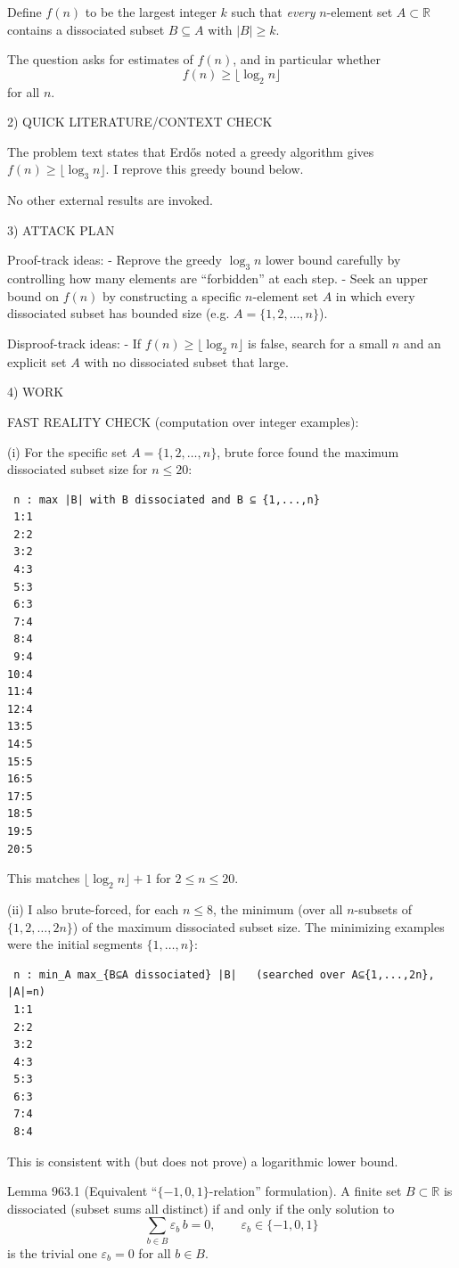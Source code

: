 Define $f(n)$ to be the largest integer $k$ such that \emph{every} $n$-element set $A\subset\mathbb R$ contains a dissociated subset $B\subseteq A$ with $|B|\ge k$.

The question asks for estimates of $f(n)$, and in particular whether
\[
 f(n)\ge \lfloor \log_2 n\rfloor
\]
for all $n$.

2) QUICK LITERATURE/CONTEXT CHECK

The problem text states that Erd\H{o}s noted a greedy algorithm gives $f(n)\ge \lfloor \log_3 n\rfloor$. I reprove this greedy bound below.

No other external results are invoked.

3) ATTACK PLAN

Proof-track ideas:
- Reprove the greedy $\log_3 n$ lower bound carefully by controlling how many elements are “forbidden” at each step.
- Seek an upper bound on $f(n)$ by constructing a specific $n$-element set $A$ in which every dissociated subset has bounded size (e.g. $A=\{1,2,\dots,n\}$).

Disproof-track ideas:
- If $f(n)\ge \lfloor\log_2 n\rfloor$ is false, search for a small $n$ and an explicit set $A$ with no dissociated subset that large.

4) WORK

FAST REALITY CHECK (computation over integer examples):

(i) For the specific set $A=\{1,2,\dots,n\}$, brute force found the maximum dissociated subset size for $n\le 20$:
\begin{verbatim}
 n : max |B| with B dissociated and B ⊆ {1,...,n}
 1:1
 2:2
 3:2
 4:3
 5:3
 6:3
 7:4
 8:4
 9:4
10:4
11:4
12:4
13:5
14:5
15:5
16:5
17:5
18:5
19:5
20:5
\end{verbatim}
This matches $\lfloor \log_2 n\rfloor+1$ for $2\le n\le 20$.

(ii) I also brute-forced, for each $n\le 8$, the minimum (over all $n$-subsets of $\{1,2,\dots,2n\}$) of the maximum dissociated subset size. The minimizing examples were the initial segments $\{1,\dots,n\}$:
\begin{verbatim}
 n : min_A max_{B⊆A dissociated} |B|   (searched over A⊆{1,...,2n}, |A|=n)
 1:1
 2:2
 3:2
 4:3
 5:3
 6:3
 7:4
 8:4
\end{verbatim}
This is consistent with (but does not prove) a logarithmic lower bound.

Lemma 963.1 (Equivalent “$\{-1,0,1\}$-relation” formulation).
A finite set $B\subset\mathbb R$ is dissociated (subset sums all distinct) if and only if the only solution to
\[
\sum_{b\in B} \varepsilon_b\, b = 0,\qquad \varepsilon_b\in\{-1,0,1\}
\]
is the trivial one $\varepsilon_b=0$ for all $b\in B$.

